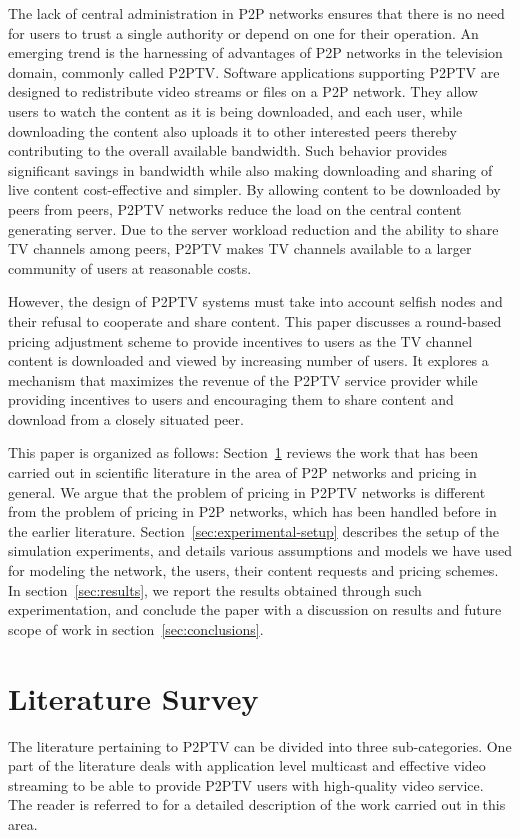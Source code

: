 \documentclass[conference,a4paper]{IEEEtran}
\begin{document}
The lack of central administration in P2P networks ensures that there is no need for users to trust a single authority or depend on one for their operation. An emerging trend is the harnessing of advantages of P2P networks in the television domain, commonly called P2PTV. Software applications supporting P2PTV are designed to redistribute video streams or files on a P2P network. They allow users to watch the content as it is being downloaded, and each user, while downloading the content also uploads it to other interested peers thereby contributing to the overall available bandwidth. Such behavior provides significant savings in bandwidth while also making downloading and sharing of live content cost-effective and simpler. By allowing content to be downloaded by peers from peers, P2PTV networks reduce the load on the central content generating server. Due to the server workload reduction and the ability to share TV channels among peers, P2PTV makes TV channels available to a larger community of users at reasonable costs.

However, the design of P2PTV systems must take into account selfish nodes and their refusal to cooperate and share content. This paper discusses a round-based pricing adjustment scheme to provide incentives to users as the TV channel content is downloaded and viewed by increasing number of users. It explores a mechanism that maximizes the revenue of the P2PTV service provider while providing incentives to users and encouraging them to share content and download from a closely situated peer.

This paper is organized as follows: Section~\ref{sec:literature-survey} reviews the work that has been carried out in scientific literature in the area of P2P networks and pricing in general. We argue that the problem of pricing in P2PTV networks is different from the problem of pricing in P2P networks, which has been handled before in the earlier literature. Section~\ref{sec:experimental-setup} describes the setup of the simulation experiments, and details various assumptions and models we have used for modeling the network, the users, their content requests and pricing schemes. In section~\ref{sec:results}, we report the results obtained through such experimentation, and conclude the paper with a discussion on results and future scope of work in section~\ref{sec:conclusions}.

\section{Literature Survey}
\label{sec:literature-survey}
The literature pertaining to P2PTV can be divided into three sub-categories. One part of the literature deals with application level multicast and effective video streaming to be able to provide P2PTV users with high-quality video service. The reader is referred to \cite{Banerjee2002, Banerjee2004, Chu2000, Dominguez2007} for a detailed description of the work carried out in this area.
\end{document}

